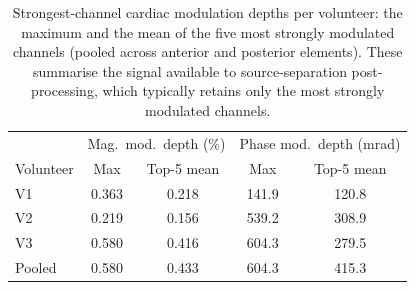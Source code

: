 \documentclass[
]{article}
\begin{document}
\begin{table}[htbp]
\centering
\caption{Experimental S-parameter levels and cardiac modulation depths per volunteer. Magnitude modulation depth is the peak-to-peak excursion of the averaged cardiac waveform in $S_{1,n}$\,(dB) as a percentage of the mean level; phase modulation depth is the peak-to-peak phase excursion in milliradians. N\textsubscript{cycles} denotes the number of cardiac cycles averaged.}
\label{tab:exp-sparams}
\end{table}

\begin{table}[htbp]
\centering
\caption{Strongest-channel cardiac modulation depths per volunteer: the maximum and the mean of the five most strongly modulated channels (pooled across anterior and posterior elements). These summarise the signal available to source-separation post-processing, which typically retains only the most strongly modulated channels.}
\label{tab:exp-topN}
\begin{tabular}{lcccc}
\hline
 & \multicolumn{2}{c}{Mag.\ mod.\ depth (\%)} & \multicolumn{2}{c}{Phase mod.\ depth (mrad)} \\
Volunteer & Max & Top-5 mean & Max & Top-5 mean \\
\hline
V1 & 0.363 & 0.218 & 141.9 & 120.8 \\
V2 & 0.219 & 0.156 & 539.2 & 308.9 \\
V3 & 0.580 & 0.416 & 604.3 & 279.5 \\
\hline
Pooled & 0.580 & 0.433 & 604.3 & 415.3 \\
\hline
\end{tabular}
\end{table}
\end{document}

